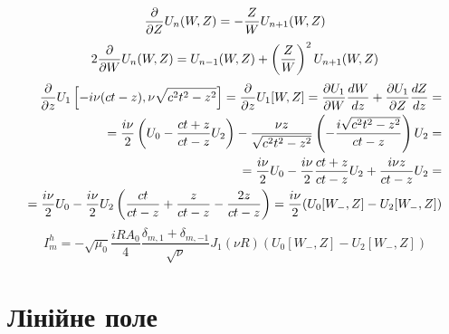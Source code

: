 %
\textcolor{lightgray} { \begin{equation*} 
\frac{\partial }{\partial Z} U_n (W,Z) = - \frac{Z}{W} U_{n+1} (W,Z)
\end{equation*} }
%
\textcolor{lightgray} { \begin{equation*}
2 \frac{\partial }{\partial W} U_n (W,Z) = U_{n-1} (W,Z) + 
\left( \frac{Z}{W} \right)^2 U_{n+1} (W,Z)
\end{equation*} }
%
\textcolor{lightgray} { \begin{equation*} \begin{aligned}
\frac{\partial }{\partial z} U_1 \left[ -i \nu (ct-z), \nu \sqrt{c^2t^2-z^2} \right] =
\frac{\partial }{\partial z} U_1[W,Z] = \frac{\partial U_1}{\partial W} \frac{d W}{d z} + 
\frac{\partial U_1}{\partial Z} \frac{d Z}{d z} = \\
= \frac{i \nu}{2} \left( U_0 - \frac{ct+z}{ct-z} U_2 \right) -
\frac{\nu z}{\sqrt{c^2t^2 - z^2}} 
\left( - \frac{i \sqrt{c^2t^2-z^2}}{ct-z} \right) U_2 = \\
= \frac{i \nu}{2} U_0 - \frac{i \nu}{2} \frac{ct+z}{ct-z} U_2 +
\frac{i \nu z}{ct-z} U_2 = \\ = \frac{i \nu}{2} U_0 - \frac{i \nu}{2} U_2
\left( \frac{ct}{ct-z} + \frac{z}{ct-z} - \frac{2z}{ct-z} \right) = 
\frac{i \nu}{2} (U_0[W_-,Z] - U_2[W_-,Z])
\end{aligned} \end{equation*} }
%
\begin{equation}
I_{m}^{h} = - \sqrt{\mu_0} \frac{iR A_0}{4} 
\frac{\delta_{m,1} + \delta_{m,-1}}{\sqrt{\nu}} 
J_1 (\nu R) \left( U_0 [ W_-, Z ] - U_2 [ W_-, Z ] \right)
\end{equation}

\section{Лінійне поле}

